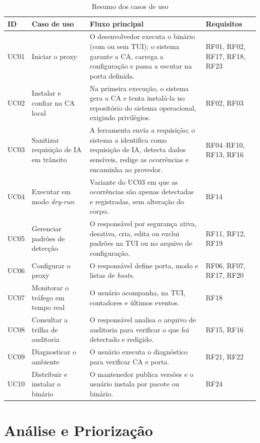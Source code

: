 \begin{table}[htb]
\centering
\caption{Resumo dos casos de uso}\label{tab:uc}
\small
\begin{tabular}{|p{1.1cm}|p{3.7cm}|p{7.3cm}|p{2.5cm}|}
\hline
\textbf{ID} & \textbf{Caso de uso} & \textbf{Fluxo principal} & \textbf{Requisitos} \\ \hline
UC01 & Iniciar o proxy & O desenvolvedor executa o binário (com ou sem TUI); o sistema garante a CA, carrega a configuração e passa a escutar na porta definida. & RF01, RF02, RF17, RF18, RF23 \\ \hline
UC02 & Instalar e confiar na CA local & Na primeira execução, o sistema gera a CA e tenta instalá-la no repositório do sistema operacional, exigindo privilégios. & RF02, RF03 \\ \hline
UC03 & Sanitizar requisição de IA em trânsito & A ferramenta envia a requisição; o sistema a identifica como requisição de IA, detecta dados sensíveis, redige as ocorrências e encaminha ao provedor. & RF04--RF10, RF13, RF16 \\ \hline
UC04 & Executar em modo \textit{dry-run} & Variante do UC03 em que as ocorrências são apenas detectadas e registradas, sem alteração do corpo. & RF14 \\ \hline
UC05 & Gerenciar padrões de detecção & O responsável por segurança ativa, desativa, cria, edita ou exclui padrões na TUI ou no arquivo de configuração. & RF11, RF12, RF19 \\ \hline
UC06 & Configurar o proxy & O responsável define porta, modo e listas de \textit{hosts}. & RF06, RF07, RF17, RF20 \\ \hline
UC07 & Monitorar o tráfego em tempo real & O usuário acompanha, na TUI, contadores e últimos eventos. & RF18 \\ \hline
UC08 & Consultar a trilha de auditoria & O responsável analisa o arquivo de auditoria para verificar o que foi detectado e redigido. & RF15, RF16 \\ \hline
UC09 & Diagnosticar o ambiente & O usuário executa o diagnóstico para verificar CA e porta. & RF21, RF22 \\ \hline
UC10 & Distribuir e instalar o binário & O mantenedor publica versões e o usuário instala por pacote ou binário. & RF24 \\ \hline
\end{tabular}
\end{table}

\section{Análise e Priorização}

